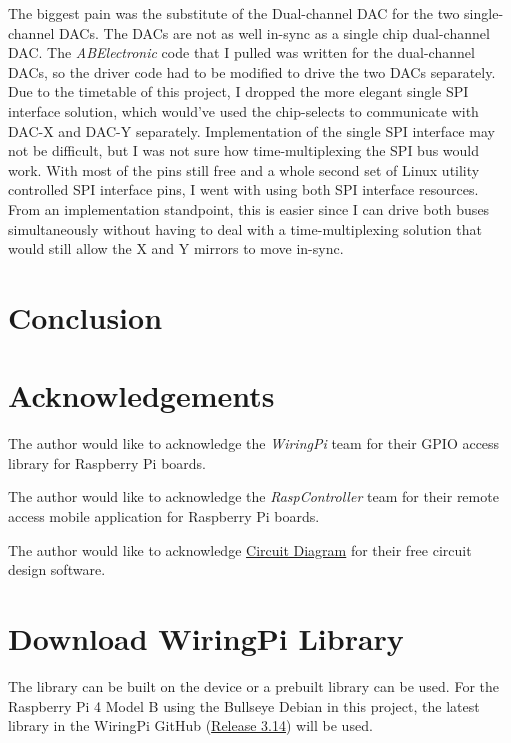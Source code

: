 \documentclass[journal]{IEEEtran}
\begin{document}
    The biggest pain was the substitute of the Dual-channel DAC for the two single-channel DACs. 
    The DACs are not as well in-sync as a single chip dual-channel DAC.
    The \emph{ABElectronic} code that I pulled was written for the dual-channel DACs, so the driver code had to be modified to drive the two DACs separately.
    Due to the timetable of this project, I dropped the more elegant single SPI interface solution, which would've used the chip-selects to communicate with DAC-X and DAC-Y separately.
    Implementation of the single SPI interface may not be difficult, but I was not sure how time-multiplexing the SPI bus would work.
    With most of the pins still free and a whole second set of Linux utility controlled SPI interface pins, I went with using both SPI interface resources.
    From an implementation standpoint, this is easier since I can drive both buses simultaneously without having to deal with a time-multiplexing solution that would still allow the X and Y mirrors to move in-sync.
     
    \section{Conclusion}

    \nocite{*}
    \newpage

    
    

    \newpage
    \section{Acknowledgements}
    The author would like to acknowledge the \emph{WiringPi} team for their GPIO access library for Raspberry Pi boards. \newline

    The author would like to acknowledge the \emph{RaspController} team for their remote access mobile application for Raspberry Pi boards.

    The author would like to acknowledge {\href{https://www.circuit-diagram.org/editor/}{Circuit Diagram}} for their free circuit design software. 

    \newpage
    \appendices
    \section{Download WiringPi Library}
    The library can be built on the device or a prebuilt library can be used. 
    For the Raspberry Pi 4 Model B using the Bullseye Debian in this project, the latest library in the WiringPi GitHub ({\href{https://github.com/WiringPi/WiringPi/releases/tag/3.14}{Release 3.14}}) will be used.
\end{document}
